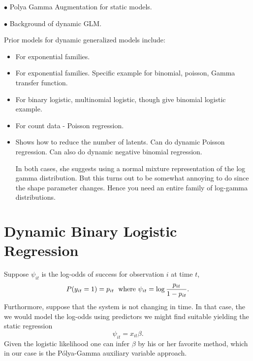 \documentclass[11pt]{article}
\newcommand{\Polya}{P\'{o}lya}
\newcommand{\PG}{\text{PG}}
\newcommand{\point}{\noindent $\bullet$ }
\begin{document}

\point Polya Gamma Augmentation for static models.

\point Background of dynamic GLM.

Prior models for dynamic generalized models include:

\begin{itemize}
\item \cite{west-etal-1985}

  For exponential families.

\item \cite{ravines-etal-2006}

  For exponential families.  Specific example for binomial, poisson, Gamma
  transfer function.

\item \cite{fruhwirth-schnatter-fruhwirth-2007}

  For binary logistic, multinomial logistic, though give binomial logistic example.

\item \cite{fruhwirth-schnatter-wagner-2006}

  For count data - Poisson regression.

\item \cite{fruhwirth-schnatter-etal-2009}

  Shows how to reduce the number of latents.  Can do dynamic Poisson regression.
  Can also do dynamic negative binomial regression.

  In both cases, she suggests using a normal mixture representation of the log
  gamma distribution.  But this turns out to be somewhat annoying to do since
  the shape parameter changes.  Hence you need an entire family of log-gamma
  distributions.

\end{itemize}

\section{Dynamic Binary Logistic Regression}

Suppose $\psi_{it}$ is the log-odds of success for observation $i$ at time $t$,
\[
P(y_{it}=1) = p_{it} \; \textmd{ where } \psi_{it} = \log \frac{p_{it}}{1-p_{it}}.
\]
Furthormore, suppose that the system is not changing in time.  In that case, the
we would model the log-odds using predictors we might find suitable yielding the
static regression
\[
\psi_{it} = x_{it} \beta.
\]
Given the logistic likelihood one can infer $\beta$ by his or her favorite
method, which in our case is the \Polya-Gamma auxiliary variable approach.
\end{document}
